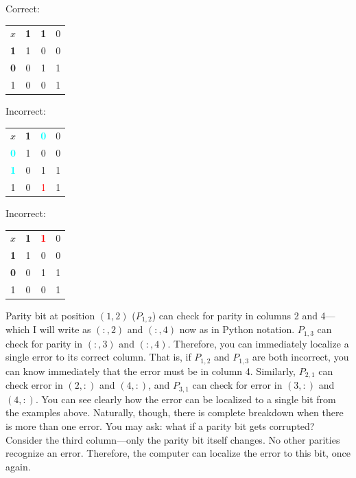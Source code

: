 \begin{center}
\begin{multicols}{3}

Correct: \medskip

    \begin{tabular}{c|c|c|c}
         $x$ &  \textbf{1} & \textbf{1} & 0 \\
         \textbf{1} &  1 & 0 & 0\\
         \textbf{0} & 0 & 1 & 1\\
         1 & 0 & 0 & 1
    \end{tabular}


Incorrect: \medskip

    \begin{tabular}{c|c|c|c}
         $x$ &  \textbf{1} & \textcolor{cyan}{\textbf{0}} & 0 \\
         \textcolor{cyan}{\textbf{0}} &  1 & 0 & 0\\
         \textcolor{cyan}{\textbf{1}} & 0 & 1 & 1\\
         1 & 0 & \textcolor{red}{1} & 1
    \end{tabular}

Incorrect: \medskip

    \begin{tabular}{c|c|c|c}
         $x$ &  \textbf{1} & \textcolor{red}{\textbf{1}} & 0 \\
         \textbf{1} &  1 & 0 & 0\\
         \textbf{0} & 0 & 1 & 1\\
         1 & 0 & 0 & 1
    \end{tabular}

\end{multicols}
\end{center}

Parity bit at position $(1,2)$ ($P_{1,2}$) can check for parity in columns 2 and 4---which I will write as $(:,2)$ and $(:,4)$ now as in Python notation. $P_{1,3}$ can check for parity in $(:,3)$ and $(:,4)$. Therefore, you can immediately localize a single error to its correct column. That is, if $P_{1,2}$ and $P_{1,3}$ are both incorrect, you can know immediately that the error must be in column 4. Similarly, $P_{2,1}$ can check error in $(2,:)$ and $(4,:)$, and $P_{3,1}$ can check for error in $(3,:)$ and $(4,:)$. You can see clearly how the error can be localized to a single bit from the examples above. Naturally, though, there is complete breakdown when there is more than one error. You may ask: what if a parity bit gets corrupted? Consider the third column---only the parity bit itself changes. No other parities recognize an error. Therefore, the computer can localize the error to this bit, once again.\newline

